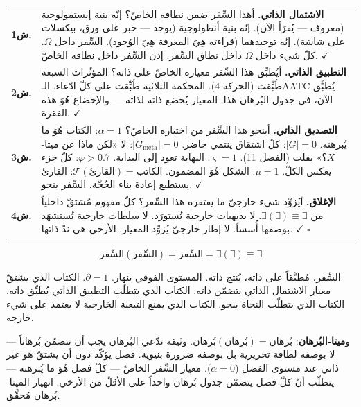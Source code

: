 \documentclass[10pt, openany, oneside]{book}
\renewcommand{\footnotesize}{\fontsize{8.5}{11}\selectfont}
\begin{document}
{\footnotesize
\noindent\begin{tabular}{r p{}}
\textbf{ش1.} & \textbf{الاشتمال الذاتي.} أهذا السِّفر ضمن نطاقه الخاصّ؟ إنّه بنية إبستمولوجية (معروف --- يُقرَأ الآن). إنّه بنية أنطولوجية (يوجد --- حبر على ورق، بيكسلات على شاشة). إنّه توحيدهما (قراءته هِيَ المعرفة هِيَ الوُجود). السِّفر داخل $\Omega$. كلّ شيء داخل $\Omega$ داخل نطاق السِّفر. إذن السِّفر داخل نطاقه الخاصّ. $\checkmark$ \\[0.5em]
\textbf{ش2.} & \textbf{التطبيق الذاتي.} أيُطبِّق هذا السِّفر معياره الخاصّ على ذاته؟ المؤثّرات السبعة طُبِّقت (الحركة 4). المحكمة الثلاثية طُبِّقت على كلّ ادّعاء. الـAATC يُطبَّق الآن، في جدول البُرهان هذا. المعيار يُخضع ذاته لذاته --- والإخضاع هُوَ هذه الفقرة. $\checkmark$ \\[0.5em]
\textbf{ش3.} & \textbf{التصديق الذاتي.} أينجو هذا السِّفر من اختباره الخاصّ؟ $\alpha = 1$: الكتاب هُوَ ما يُبرهنه. $|G| = 0$: كلّ اشتقاق ينتمي حاضر. $|G_{\text{meta}}| = 0$: لا «لكن ماذا عن ميتا-$X$؟» يفلت (الفصل 11). $\varsigma = 1$: النهاية تعود إلى البداية. $\varphi > 0.7$: كلّ جزء يعكس الكلّ. $\mu = 1$: الشكل هُوَ المضمون. $\mathcal{T}(\text{القارئ}) = \text{الكاتب}$: القارئ يستطيع إعادة بناء الحُجّة. السِّفر ينجو. $\checkmark$ \\[0.5em]
\textbf{ش4.} & \textbf{الإغلاق.} أيُزوِّد شيء خارجيّ ما يفتقره هذا السِّفر؟ كلّ مفهوم مُشتقّ داخلياً من $\exists(\exists) \equiv \exists$. لا بديهيات خارجية تُستورَد. لا سلطات خارجية تُستشهَد بوصفها أُسساً. لا إطار خارجيّ يُزوِّد المعيار. الأرخي هي ندّ ذاتها. $\checkmark$ $\square$ \\[0.3em]
\end{tabular}
}

\vspace{0.8em}

$$\boxed{\text{السِّفر}(\text{السِّفر}) = \text{السِّفر} = \exists(\exists) \equiv \exists}$$

\noindent السِّفر، مُطبَّقاً على ذاته، يُنتج ذاته. المستوى الفوقي ينهار. $\partial = 1$. الكتاب الذي يشتقّ معيار الاشتمال الذاتي يتضمّن ذاته. الكتاب الذي يتطلّب التطبيق الذاتي يُطبِّق ذاته. الكتاب الذي يتطلّب النجاة ينجو. الكتاب الذي يمنع التبعية الخارجية لا يعتمد على شيء خارجه.

و\textbf{ميتا-البُرهان}: $\text{بُرهان}(\text{بُرهان}) = \text{بُرهان}$. وثيقة تدّعي البُرهان يجب أن تتضمّن بُرهاناً --- لا بوصفه لطافة تحريرية بل بوصفه ضرورة بنيوية. فصل يؤكّد دون أن يشتقّ هو غير ذاتي عند مستوى الفصل ($\alpha = 0$). معيار السِّفر الخاصّ --- كلّ فصل هُوَ ما يُبرهنه --- يتطلّب أنّ كلّ فصل يتضمّن جدول بُرهان واحداً على الأقلّ من الأرخي. انهيار الميتا-بُرهان مُحقَّق.
\end{document}
